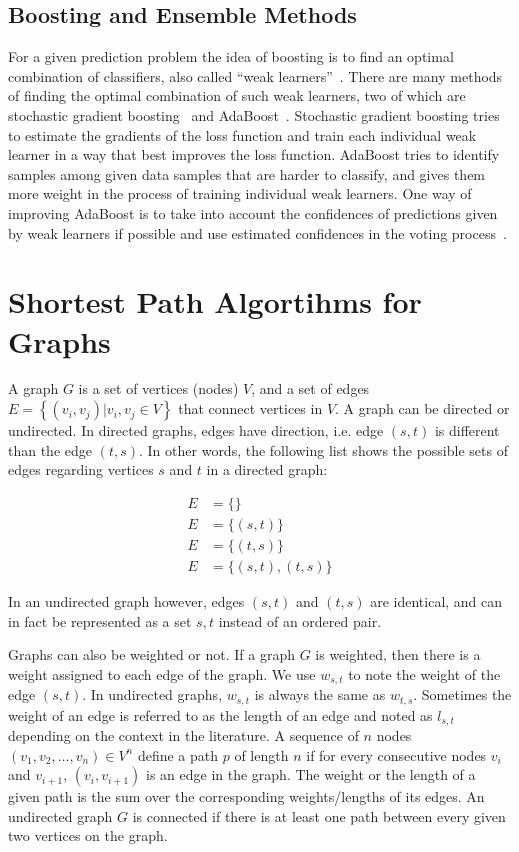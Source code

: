 \subsection{Boosting and Ensemble Methods}
For a given prediction problem the idea of boosting is to find an optimal combination of classifiers, also called ``weak learners''~\cite{ensemble2002}. There are many methods of finding the optimal combination of such weak learners, two of which are stochastic gradient boosting~\cite{friedman2002stochastic} and AdaBoost~\cite{adaboost97}. Stochastic gradient boosting tries to estimate the gradients of the loss function and train each individual weak learner in a way that best improves the loss function. AdaBoost tries to identify samples among given data samples that are harder to classify, and gives them more weight in the process of training individual weak learners. One way of improving AdaBoost is to take into account the confidences of predictions given by weak learners if possible and use estimated confidences in the voting process~\cite{adaboost99improved}.

\section{Shortest Path Algortihms for Graphs}
A graph $G$ is a set of vertices (nodes) $V$, and a set of edges $E=\left\{(v_i, v_j) | v_i, v_j \in V\right\}$ that connect vertices in $V$. A graph can be directed or undirected. In directed graphs, edges have direction, i.e. edge $(s, t)$ is different than the edge $(t, s)$. In other words, the following list shows the possible sets of edges regarding vertices $s$ and $t$ in a directed graph:

\begin{align}
  E &= \{\} \nonumber \\
  E &= \{(s, t)\} \nonumber \\
  E &= \{(t, s)\} \nonumber \\
  E &= \{(s, t), (t, s)\}
\end{align}

In an undirected graph however, edges $(s, t)$ and $(t, s)$ are identical, and can in fact be represented as a set ${s, t}$ instead of an ordered pair.

Graphs can also be weighted or not. If a graph $G$ is weighted, then there is a weight assigned to each edge of the graph. We use $w_{s,t}$ to note the weight of the edge $(s,t)$. In undirected graphs, $w_{s, t}$ is always the same as $w_{t, s}$. Sometimes the weight of an edge is referred to as the length of an edge and noted as $l_{s,t}$ depending on the context in the literature. A sequence of $n$ nodes $(v_1, v_2,\ldots,v_n) \in V^n$ define a path $p$ of length $n$ if for every consecutive nodes $v_i$ and $v_{i+1}$, $(v_i, v_{i+1})$ is an edge in the graph. The weight or the length of a given path is the sum over the corresponding weights/lengths of its edges.
An undirected graph $G$ is connected if there is at least one path between every given two vertices on the graph.

